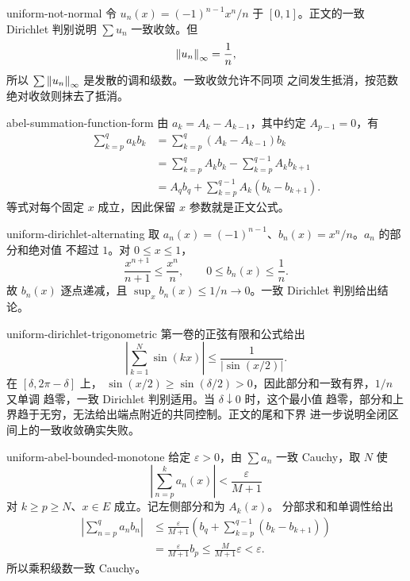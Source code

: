 \begin{solution}{uniform-not-normal}
令 \(u_n(x)=(-1)^{n-1}x^n/n\) 于 \([0,1]\)。正文的一致 Dirichlet
判别说明 \(\sum u_n\) 一致收敛。但
\[
 \left\lVert u_n\right\rVert_\infty=\frac1n,
\]
所以 \(\sum\left\lVert u_n\right\rVert_\infty\) 是发散的调和级数。一致收敛允许不同项
之间发生抵消，按范数绝对收敛则抹去了抵消。
\end{solution}

\begin{solution}{abel-summation-function-form}
由 \(a_k=A_k-A_{k-1}\)，其中约定 \(A_{p-1}=0\)，有
\[
\begin{aligned}
 \sum_{k=p}^qa_kb_k
 &=\sum_{k=p}^q(A_k-A_{k-1})b_k\\
 &=\sum_{k=p}^qA_kb_k-\sum_{k=p}^{q-1}A_kb_{k+1}\\
 &=A_qb_q+\sum_{k=p}^{q-1}A_k(b_k-b_{k+1}).
\end{aligned}
\]
等式对每个固定 \(x\) 成立，因此保留 \(x\) 参数就是正文公式。
\end{solution}

\begin{solution}{uniform-dirichlet-alternating}
取 \(a_n(x)=(-1)^{n-1}\)、\(b_n(x)=x^n/n\)。\(a_n\) 的部分和绝对值
不超过 \(1\)。对 \(0\le x\le1\)，
\[
 \frac{x^{n+1}}{n+1}\le\frac{x^n}{n},\qquad
 0\le b_n(x)\le\frac1n.
\]
故 \(b_n(x)\) 逐点递减，且 \(\sup_xb_n(x)\le1/n\to0\)。一致
Dirichlet 判别给出结论。
\end{solution}

\begin{solution}{uniform-dirichlet-trigonometric}
第一卷的正弦有限和公式给出
\[
 \left|\sum_{k=1}^N\sin(kx)\right|
 \le\frac1{|\sin(x/2)|}.
\]
在 \([\delta,2\pi-\delta]\) 上，
\(\sin(x/2)\ge\sin(\delta/2)>0\)，因此部分和一致有界，\(1/n\) 又单调
趋零，一致 Dirichlet 判别适用。当 \(\delta\downarrow0\) 时，这个最小值
趋零，部分和上界趋于无穷，无法给出端点附近的共同控制。正文的尾和下界
进一步说明全闭区间上的一致收敛确实失败。
\end{solution}

\begin{solution}{uniform-abel-bounded-monotone}
给定 \(\varepsilon>0\)，由 \(\sum a_n\) 一致 Cauchy，取 \(N\) 使
\[
 \left|\sum_{n=p}^ka_n(x)\right|
 <\frac{\varepsilon}{M+1}
\]
对 \(k\ge p\ge N\)、\(x\in E\) 成立。记左侧部分和为 \(A_k(x)\)。
分部求和和单调性给出
\[
\begin{aligned}
 \left|\sum_{n=p}^qa_nb_n\right|
 &\le\frac{\varepsilon}{M+1}
 \left(b_q+\sum_{k=p}^{q-1}(b_k-b_{k+1})\right)\\
 &=\frac{\varepsilon}{M+1}b_p
 \le\frac{M}{M+1}\varepsilon<\varepsilon.
\end{aligned}
\]
所以乘积级数一致 Cauchy。
\end{solution}

